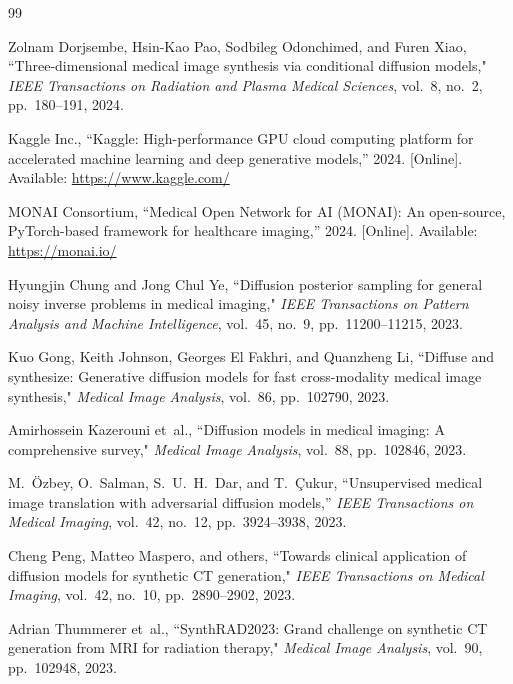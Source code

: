 \begin{thebibliography}{99}

Zolnam Dorjsembe, Hsin-Kao Pao, Sodbileg Odonchimed, and Furen Xiao, ``Three-dimensional medical image synthesis via conditional diffusion models," \emph{IEEE Transactions on Radiation and Plasma Medical Sciences}, vol.~8, no.~2, pp.~180--191, 2024.

Kaggle Inc., ``Kaggle: High-performance GPU cloud computing platform for accelerated machine learning and deep generative models,'' 2024. [Online]. Available: \url{https://www.kaggle.com/}

MONAI Consortium, ``Medical Open Network for AI (MONAI): An open-source, PyTorch-based framework for healthcare imaging,'' 2024. [Online]. Available: \url{https://monai.io/}

Hyungjin Chung and Jong Chul Ye, ``Diffusion posterior sampling for general noisy inverse problems in medical imaging," \emph{IEEE Transactions on Pattern Analysis and Machine Intelligence}, vol.~45, no.~9, pp.~11200--11215, 2023.

Kuo Gong, Keith Johnson, Georges El Fakhri, and Quanzheng Li, ``Diffuse and synthesize: Generative diffusion models for fast cross-modality medical image synthesis," \emph{Medical Image Analysis}, vol.~86, pp.~102790, 2023.

Amirhossein Kazerouni et~al., ``Diffusion models in medical imaging: A comprehensive survey," \emph{Medical Image Analysis}, vol.~88, pp.~102846, 2023.

M.~{\"O}zbey, O.~Salman, S.~U.~H.~Dar, and T.~{\c{C}}ukur, ``Unsupervised medical image translation with adversarial diffusion models,'' \emph{IEEE Transactions on Medical Imaging}, vol.~42, no.~12, pp.~3924--3938, 2023.

Cheng Peng, Matteo Maspero, and others, ``Towards clinical application of diffusion models for synthetic CT generation," \emph{IEEE Transactions on Medical Imaging}, vol.~42, no.~10, pp.~2890--2902, 2023.

Adrian Thummerer et~al., ``SynthRAD2023: Grand challenge on synthetic CT generation from MRI for radiation therapy," \emph{Medical Image Analysis}, vol.~90, pp.~102948, 2023.


\end{thebibliography}
